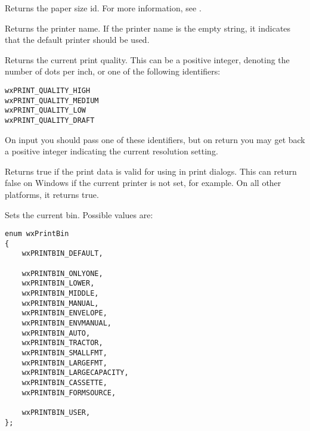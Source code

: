 \label{wxprintdatagetpaperid}


Returns the paper size id. For more information, see .


\label{wxprintdatagetprintername}


Returns the printer name. If the printer name is the empty string, it indicates that the default
printer should be used.


\label{wxprintdatagetquality}


Returns the current print quality. This can be a positive integer, denoting the number of dots per inch, or
one of the following identifiers:

\begin{verbatim}
wxPRINT_QUALITY_HIGH
wxPRINT_QUALITY_MEDIUM
wxPRINT_QUALITY_LOW
wxPRINT_QUALITY_DRAFT
\end{verbatim}

On input you should pass one of these identifiers, but on return you may get back a positive integer
indicating the current resolution setting.


\label{wxprintdataisok}


Returns true if the print data is valid for using in print dialogs.
This can return false on Windows if the current printer is not set, for example.
On all other platforms, it returns true.


\label{wxprintdatasetbin}


Sets the current bin. Possible values are:

\small{
\begin{verbatim}
enum wxPrintBin
{
    wxPRINTBIN_DEFAULT,

    wxPRINTBIN_ONLYONE,
    wxPRINTBIN_LOWER,
    wxPRINTBIN_MIDDLE,
    wxPRINTBIN_MANUAL,
    wxPRINTBIN_ENVELOPE,
    wxPRINTBIN_ENVMANUAL,
    wxPRINTBIN_AUTO,
    wxPRINTBIN_TRACTOR,
    wxPRINTBIN_SMALLFMT,
    wxPRINTBIN_LARGEFMT,
    wxPRINTBIN_LARGECAPACITY,
    wxPRINTBIN_CASSETTE,
    wxPRINTBIN_FORMSOURCE,

    wxPRINTBIN_USER,
};
\end{verbatim}
}


